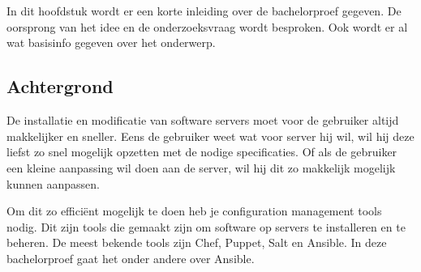 
\chapter{}
\label{ch:inleiding}
In dit hoofdstuk wordt er een korte inleiding over de bachelorproef gegeven. De oorsprong van het idee en de onderzoeksvraag wordt besproken. Ook wordt er al wat basisinfo gegeven over het onderwerp.

\section{Achtergrond}
De installatie en modificatie van software servers moet voor de gebruiker altijd makkelijker en sneller. Eens de gebruiker weet wat voor server hij wil, wil hij deze liefst zo snel mogelijk opzetten met de nodige specificaties. Of als de gebruiker een kleine aanpassing wil doen aan de server, wil hij dit zo makkelijk mogelijk kunnen aanpassen. 

Om dit zo efficiënt mogelijk te doen heb je configuration management tools nodig. Dit zijn tools die gemaakt zijn om software op servers te installeren en te beheren. De meest bekende tools zijn Chef, Puppet, Salt en Ansible. In deze bachelorproef gaat het onder andere over Ansible. 



